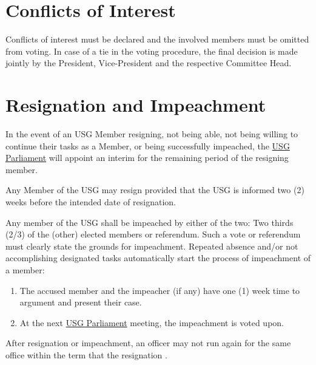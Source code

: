 {	\protect\section{Conflicts of Interest}
	Conflicts of interest must be declared and the involved members must be omitted from voting. In case of a tie in the voting procedure, the final decision is made jointly by the President, Vice-President and the respective Committee Head.
	
	
	
	\protect\section{Resignation and Impeachment}
	In the event of an USG Member resigning, not being able, not being willing to continue their tasks as a Member, or being successfully impeached, the \hyperref[USGParliamentDef]{USG Parliament} will appoint an interim for the remaining period of the resigning member.
	
	\protect\begin{parenum}
		\item Any Member of the USG may resign provided that the USG is informed two (2) weeks before the intended date of resignation.
		
		\item Any member of the USG shall be impeached by either of the two: Two thirds (2/3) of the (other) elected members or referendum. Such a vote or referendum must clearly state the grounds for impeachment. Repeated absence  and/or not accomplishing designated tasks automatically start the process of impeachment of a member:
		\begin{enumerate}
			\item The accused member and the impeacher (if any) have one (1) week time to argument and present their case.
			\item At the next \hyperref[USGParliamentDef]{USG Parliament} meeting, the impeachment is voted upon.
		\end{enumerate}
		
		\item After resignation or impeachment, an officer may not run again for the same office within the term that the resignation .
	\end{parenum}




}